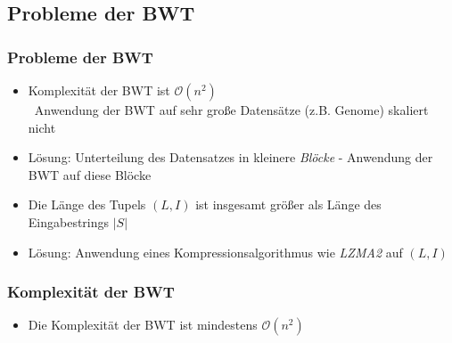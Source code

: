 \documentclass[14pt,xcolor=dvipsnames]{beamer}
\begin{document}
\subsection{Probleme der BWT}
\begin{frame}[allowframebreaks]
 \frametitle{Probleme der BWT}
 \begin{itemize}
  \item Komplexität der BWT ist $\mathcal{O}(n^2)$\\
    \textrightarrow \ Anwendung der BWT auf sehr große Datensätze (z.B. Genome) skaliert nicht
    \pause
  \item Lösung: Unterteilung des Datensatzes in kleinere \textit{Blöcke} - Anwendung der BWT auf diese Blöcke
 \end{itemize}
 
\framebreak
 \begin{itemize}
  \item Die Länge des Tupels $(L,I)$ ist insgesamt größer als Länge des Eingabestrings $|S|$
  \pause
  \item Lösung: Anwendung eines Kompressionsalgorithmus wie \textit{LZMA2} auf $(L,I)$
  \end{itemize}
\end{frame}
\begin{frame}
 \frametitle{Komplexität der BWT}
 \begin{itemize}
  \item Die Komplexität der BWT ist mindestens $\mathcal{O}(n^2)$
 \end{itemize}
\end{frame}
\end{document}
